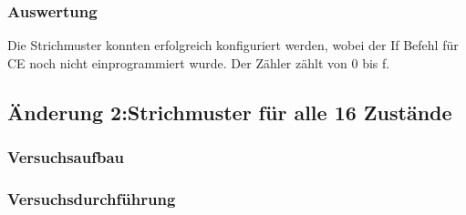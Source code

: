 \documentclass[12pt,a4paper]{article}
\begin{document}
\subsubsection*{Auswertung}
Die Strichmuster konnten erfolgreich konfiguriert werden, wobei der If Befehl für CE noch nicht einprogrammiert wurde.
Der Zähler zählt von 0 bis f.
\subsection{Änderung 2:Strichmuster für alle 16 Zustände}


\subsubsection*{Versuchsaufbau}

\subsubsection*{Versuchsdurchführung}
\end{document}
